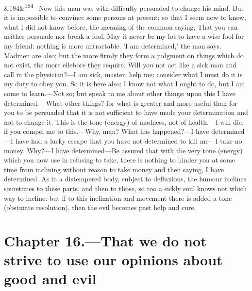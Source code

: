 \documentclass[12pt]{article}
\newcommand{\para}[1][]{\par\noindent\ifx&#1&\else\textsuperscript{\footnotesize #1}~\fi}
\begin{document}
\para[184] Now this man was with difficulty persuaded to change his mind. But it is impossible to convince some persons at present; so that I seem now to know, what I did not know before, the meaning of the common saying, That you can neither persuade nor break a fool. May it never be my lot to have a wise fool for my friend: nothing is more untractable. 'I am determined,' the man says. Madmen are also; but the more firmly they form a judgment on things which do not exist, the more ellebore they require. Will you not act like a sick man and call in the physician?—I am sick, master, help me; consider what I must do it is my duty to obey you. So it is here also: I know not what I ought to do, but I am come to learn.—Not so; but speak to me about other things: upon this I have determined.—What other things? for what is greater and more useful than for you to be persuaded that it is not sufficient to have made your determination and not to change it. This is the tone (energy) of madness, not of health.—I will die, if you compel me to this.—Why, man? What has happened?—I have determined—I have had a lucky escape that you have not determined to kill me—I take no money. Why?—I have determined—Be assured that with the very tone (energy) which you now use in refusing to take, there is nothing to hinder you at some time from inclining without reason to take money and then saying, I have determined. As in a distempered body, subject to defluxions, the humour inclines sometimes to these parts, and then to those, so too a sickly soul knows not which way to incline: but if to this inclination and movement there is added a tone (obstinate resolution), then the evil becomes past help and cure.

\section*{Chapter 16.---That we do not strive to use our opinions about good and evil}
\end{document}

